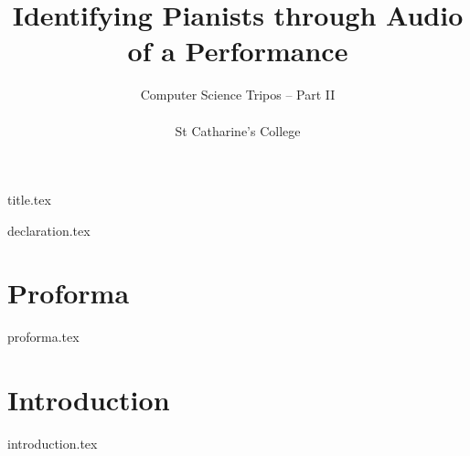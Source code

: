 \documentclass[oneside, a4paper,12pt]{book}
\title{\textbf{Identifying Pianists through Audio of a Performance}}
\author{Computer Science Tripos -- Part II \\ \\
        St Catharine's College}
\begin{document}
\frontmatter
{title.tex}



{declaration.tex}

\chapter*{Proforma}
{proforma.tex}



\tableofcontents


\mainmatter

\chapter{Introduction}
{introduction.tex}


\backmatter

\printbibliography


    
\end{document}
